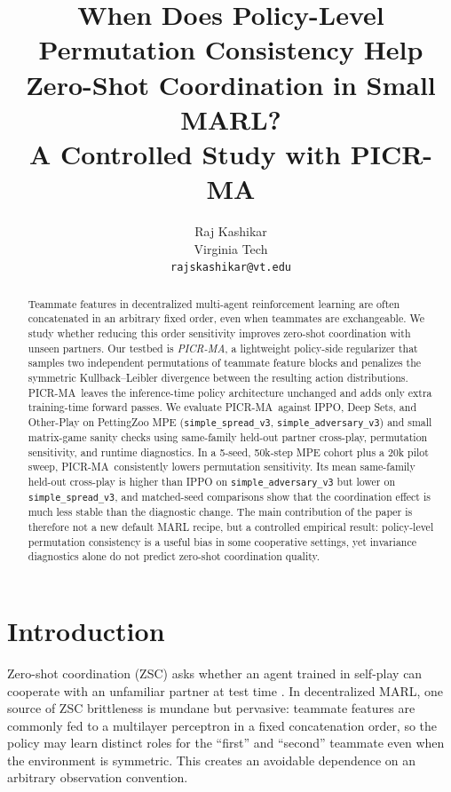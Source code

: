 \documentclass{article}
\title{When Does Policy-Level Permutation Consistency Help Zero-Shot Coordination in Small MARL?\\A Controlled Study with PICR-MA}
\author{%
  Raj Kashikar \\
  Virginia Tech \\
  \texttt{rajskashikar@vt.edu}
}
\newcommand{\method}{PICR-MA}
\begin{document}
\maketitle

\begin{abstract}
Teammate features in decentralized multi-agent reinforcement learning are often concatenated in an arbitrary fixed order, even when teammates are exchangeable. We study whether reducing this order sensitivity improves zero-shot coordination with unseen partners. Our testbed is \emph{PICR-MA}, a lightweight policy-side regularizer that samples two independent permutations of teammate feature blocks and penalizes the symmetric Kullback--Leibler divergence between the resulting action distributions. \method\ leaves the inference-time policy architecture unchanged and adds only extra training-time forward passes. We evaluate \method\ against IPPO, Deep Sets, and Other-Play on PettingZoo MPE (\texttt{simple\_spread\_v3}, \texttt{simple\_adversary\_v3}) and small matrix-game sanity checks using same-family held-out partner cross-play, permutation sensitivity, and runtime diagnostics. In a 5-seed, 50k-step MPE cohort plus a 20k pilot sweep, \method\ consistently lowers permutation sensitivity. Its mean same-family held-out cross-play is higher than IPPO on \texttt{simple\_adversary\_v3} but lower on \texttt{simple\_spread\_v3}, and matched-seed comparisons show that the coordination effect is much less stable than the diagnostic change. The main contribution of the paper is therefore not a new default MARL recipe, but a controlled empirical result: policy-level permutation consistency is a useful bias in some cooperative settings, yet invariance diagnostics alone do not predict zero-shot coordination quality.
\end{abstract}

\section{Introduction}
Zero-shot coordination (ZSC) asks whether an agent trained in self-play can cooperate with an unfamiliar partner at test time \citep{hu2020otherplay}. In decentralized MARL, one source of ZSC brittleness is mundane but pervasive: teammate features are commonly fed to a multilayer perceptron in a fixed concatenation order, so the policy may learn distinct roles for the ``first'' and ``second'' teammate even when the environment is symmetric. This creates an avoidable dependence on an arbitrary observation convention.
\end{document}
